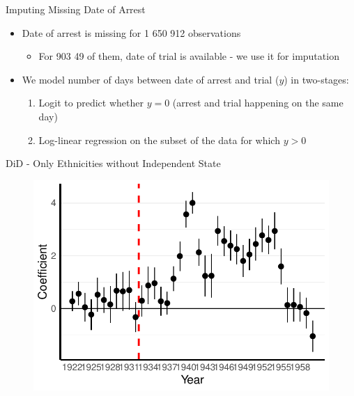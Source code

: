 \documentclass[11pt]{beamer}
\begin{document}
\begin{frame}[label=arrest_date_imputation]{Imputing Missing Date of Arrest}
\begin{itemize}
    \item Date of arrest is missing for 1 650 912 observations 
    \begin{itemize}
        \item For 903 49 of them, date of trial is available - we use it for imputation
    \end{itemize}
    \item We model number of days between date of arrest and trial ($y$) in two-stages:
    \begin{enumerate}
        \item Logit to predict whether $y = 0$ (arrest and trial happening on the same day)
        \item  Log-linear regression on the subset of the data for which $y > 0$ 
    \end{enumerate}
\end{itemize}
\hyperlink{data}{}
\end{frame}



\begin{frame}[label=did_without_ind_state]{DiD - Only Ethnicities without Independent State}
 \begin{figure}[h]
\centering
\includegraphics[width=1\textwidth]{pr_cr2_date_imp_full_years_no_trends_not_ind_country.pdf}
\end{figure}

\hyperlink{robustness_checks}{}
\end{frame}
\end{document}
